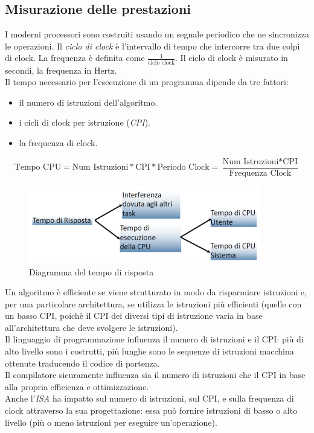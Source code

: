 \subsection{Misurazione delle prestazioni}
I moderni processori sono costruiti usando un segnale periodico che ne sincronizza le operazioni. Il \textit{ciclo di clock} è l’intervallo di tempo che intercorre tra due colpi di clock. La frequenza è definita come $\frac{1}{\text{ciclo clock}}$. Il ciclo di clock è misurato in secondi, la frequenza in Hertz.\\

Il tempo necessario per l'esecuzione di un programma dipende da tre fattori:
\begin{itemize}[nolistsep]
	\item il numero di istruzioni dell'algoritmo.
	\item i cicli di clock per istruzione (\textit{CPI}).
	\item la frequenza di clock.
\end{itemize}
\begin{equation*}
\text{Tempo CPU} = \text{Num Istruzioni} * \text{CPI} * \text{Periodo Clock} = \frac{\text{Num Istruzioni} * \text{CPI}}{\text{Frequenza Clock}}
\end{equation*}

\begin{figure}[H]
	\centering
	\includegraphics[width=0.9\textwidth,keepaspectratio]{images/tempo_risposta.png}
	\caption{Diagramma del tempo di risposta}
\end{figure}
Un algoritmo è efficiente se viene strutturato in modo da risparmiare istruzioni e, per una particolare architettura, se utilizza le istruzioni più efficienti (quelle con un basso CPI, poichè il CPI dei diversi tipi di istruzione varia in base all'architettura che deve svolgere le istruzioni).\\
Il linguaggio di programmazione influenza il numero di istruzioni e il CPI: più di alto livello sono i costrutti, più lunghe sono le sequenze di istruzioni macchina ottenute traducendo il codice di partenza.\\
Il compilatore sicuramente influenza sia il numero di istruzioni che il CPI in base alla propria efficienza e ottimizzazione.\\
Anche l'\textit{ISA} ha impatto sul numero di istruzioni, sul CPI, e sulla frequenza di clock attraverso la sua progettazione: essa può fornire istruzioni di basso o alto livello (più o meno istruzioni per eseguire un'operazione).

